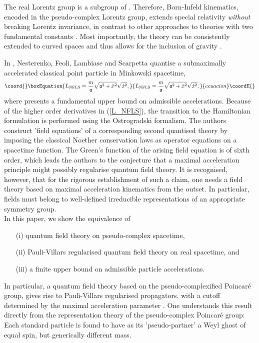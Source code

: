 \documentclass[a4paper,aps,prd,showkeys,showpacs,superscriptaddress,preprint]{revtex4}
\providecommand{\pc}{\mathbb{P}}
\begin{document}
The real Lorentz group is a subgroup of \myHighlight{$SO_\pc(1,3)$}\coordHE{}. Therefore, 
Born-Infeld kinematics, encoded in the pseudo-complex Lorentz group,
extends special relativity \textsl{without} breaking Lorentz invariance, in contrast to other
approaches to theories with two fundamental constants
\cite{Amelino-Camelia:2002wr,Kowalski-Glikman:2002ft}. 
Most importantly, the theory can be consistently
extended to curved spaces \cite{Yano1973} and thus allows for the
inclusion of gravity
\cite{Schuller:2002rr,Schuller:2002fn}.

In \cite{Nesterenko:1998jt}, Nesterenko, Feoli, Lambiase and Scarpetta
quantise a submaximally accelerated classical point particle in
Minkowski spacetime,
\begin{equation}\coord{}\boxEquation{\label{L_NFLS}
  L_{\small\textrm{NFLS}} = \frac{m}{\mathfrak{a}} \sqrt{\mathfrak{a}^2+{\ddot x}^2}\sqrt{\dot x^2},
}{L_{\small\textrm{NFLS}} = \frac{m}{\mathfrak{a}} \sqrt{\mathfrak{a}^2+{\ddot x}^2}\sqrt{\dot x^2},
}{ecuacion}\coordE{}\end{equation}
where \coordHE{} presents a fundamental upper bound on admissible
accelerations. Because of the higher order derivatives in (\ref{L_NFLS}),
the transition to the Hamiltonian formulation is performed
using the Ostrogradski formalism.
The authors construct 'field equations' of a corresponding second quantised
theory by imposing the classical Noether conservation laws as operator
equations 
on a spacetime function. The Green's function of the arising field equation
is of sixth order, which  leads the authors to the conjecture that a
maximal acceleration principle might possibly regularise quantum field theory.
It is recognised, however, that for the rigorous establishment of such a claim, one needs a field theory based on maximal acceleration kinematics from
the outset. In particular, fields must belong to well-defined
irreducible representations of an appropriate symmetry group.\\ 

\noindent In this paper, we show the equivalence of
\begin{itemize}
  \item[(i)] quantum field theory on pseudo-complex
spacetime,
  \item[(ii)] Pauli-Villars regularised quantum field
theory on real spacetime, and
  \item[(iii)] a finite upper bound on
admissible particle accelerations.
\end{itemize}
In particular, a quantum field theory based on the
pseudo-complexified Poincar\'e group, gives rise to Pauli-Villars
regularised propagators, with a cutoff determined
by the maximal acceleration parameter \coordHE{}. One understands
this result directly from the representation theory of the pseudo-complex
Poincar\'e group: Each standard particle is found to have as its
'pseudo-partner' a Weyl ghost of equal spin, but generically different
mass.\\
 
\end{document}
